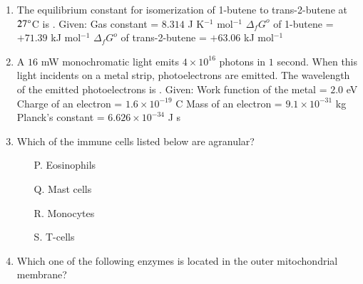 \documentclass[journal,12pt,onecolumn]{IEEEtran}
\theoremstyle{remark}
\begin{document}
\begin{enumerate}
    \hfill{}

    \item The equilibrium constant for isomerization of 1-butene to trans-2-butene at $27\degree$C is \underline{\hspace{2cm}} .
    Given: Gas constant = $8.314$ J K$^{-1}$ mol$^{-1}$
    $\Delta_f G^o$ of 1-butene = $+71.39$ kJ mol$^{-1}$
    $\Delta_f G^o$ of trans-2-butene = $+63.06$ kJ mol$^{-1}$

    \hfill{}

    \item A $16$ mW monochromatic light emits $4 \times 10^{16}$ photons in $1$ second. When this light incidents on a metal strip, photoelectrons are emitted. The wavelength of the emitted photoelectrons  is \underline{\hspace{2cm}} .
    Given: Work function of the metal = $2.0$ eV
    Charge of an electron = $1.6 \times 10^{-19}$ C
    Mass of an electron = $9.1 \times 10^{-31}$ kg
    Planck's constant = $6.626 \times 10^{-34}$ J s

    \hfill{}

     \item Which of the immune cells listed below are agranular?
    \begin{itemize}
        \item[P.] Eosinophils
        \item[Q.] Mast cells
        \item[R.] Monocytes
        \item[S.] T-cells
    \end{itemize}

    \hfill{}
    \begin{enumerate}
    \end{enumerate}

    \item Which one of the following enzymes is located in the outer mitochondrial membrane?


\end{enumerate}
\end{document}
